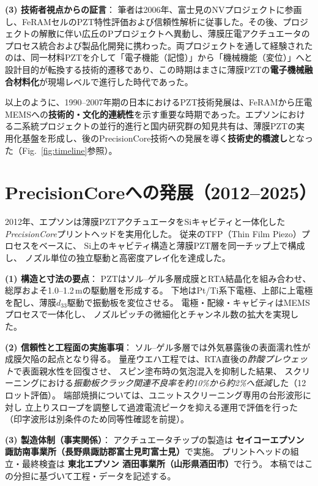 \documentclass[conference]{IEEEtran}
\begin{document}
\medskip
\noindent
\textbf{(3) 技術者視点からの証言}：
筆者は2006年、富士見のNVプロジェクトに参画し、FeRAMセルのPZT特性評価および信頼性解析に従事した。その後、プロジェクトの解散に伴い広丘のPプロジェクトへ異動し、薄膜圧電アクチュエータのプロセス統合および製品化開発に携わった。両プロジェクトを通して経験されたのは、同一材料PZTを介して「電子機能（記憶）」から「機械機能（変位）」へと設計目的が転換する技術的遷移であり、この時期はまさに薄膜PZTの\textbf{電子機械融合材料化}が現場レベルで進行した時代であった。

\medskip
以上のように、1990--2007年期の日本におけるPZT技術発展は、FeRAMから圧電MEMSへの\textbf{技術的・文化的連続性}を示す重要な時期であった。エプソンにおける二系統プロジェクトの並行的進行と国内研究群の知見共有は、薄膜PZTの実用化基盤を形成し、後のPrecisionCore技術への発展を導く\textbf{技術史的橋渡し}となった（Fig.~\ref{fig:timeline}参照）。

\section{PrecisionCoreへの発展（2012--2025）}
2012年、エプソンは薄膜PZTアクチュエータをSiキャビティと一体化した
\textit{PrecisionCore}プリントヘッドを実用化した\cite{uemura2014mems}。
従来のTFP（Thin Film Piezo）プロセスをベースに、
Si上のキャビティ構造と薄膜PZT層を同一チップ上で構成し、
ノズル単位の独立駆動と高密度アレイ化を達成した。

\medskip
\noindent
\textbf{(1) 構造と寸法の要点}：
PZTはソル–ゲル多層成膜とRTA結晶化を組み合わせ、
総厚およそ1.0--1.2\,\textmu mの駆動層を形成する。
下地はPt/Ti系下電極、上部に上電極を配し、薄膜$d_{33}$駆動で振動板を変位させる。
電極・配線・キャビティはMEMSプロセスで一体化し、
ノズルピッチの微細化とチャンネル数の拡大を実現した\cite{uemura2014mems,epson_wp_precisioncore}。

\medskip
\noindent
\textbf{(2) 信頼性と工程面の実施事項}：
ソル–ゲル多層では外気暴露後の表面濡れ性が成膜欠陥の起点となり得る。
量産ウエハ工程では、RTA直後の\emph{酢酸プレウェット}で表面親水性を回復させ、
スピン塗布時の気泡混入を抑制した結果、
スクリーニングにおける\emph{振動板クラック関連不良率を約10\%から約2\%へ低減}した（12ロット評価）。
端部焼損については、ユニットスクリーニング専用の台形波形に対し
立上りスロープを調整して過渡電流ピークを抑える運用で評価を行った
（印字波形は別条件のため同等性確認を前提）。

\medskip
\noindent
\textbf{(3) 製造体制（事実関係）}：
アクチュエータチップの製造は
\textbf{セイコーエプソン 諏訪南事業所（長野県諏訪郡富士見町富士見）}で実施。
プリントヘッドの組立・最終検査は
\textbf{東北エプソン 酒田事業所（山形県酒田市）}で行う。
本稿ではこの分担に基づいて工程・データを記述する。
\end{document}
